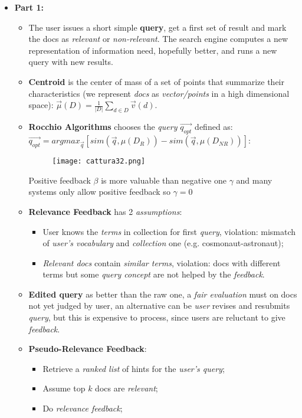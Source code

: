 \documentclass{article}
\begin{document}
\begin{itemize}
\item \textbf{Part 1:}
\begin{itemize}
\item The user issues a short simple \textbf{query}, get a first set of result and mark the docs as \emph{relevant} or \emph{non-relevant}. The search engine computes a new representation of information need, hopefully better, and runs a new query with new results. 
\item \textbf{Centroid} is the center of mass of a set of points that summarize their characteristics (we represent \emph{docs} as \emph{vector/points} in a high dimensional space): $\vec{\mu} (D) = \frac{1}{|D|}\sum_{d \in D}\vec{v}(d)$. 
\item \textbf{Rocchio Algorithms} chooses the \emph{query} $\vec{q_{opt}}$ defined as:\\ $\vec{q_{opt}} = argmax_{\vec{q}}[sim(\vec{q},\mu(D_R)) - sim(\vec{q},\mu(D_{NR}))]$:
\begin{figure}[H]
  \centering
  \texttt{[image: cattura32.png]}
\end{figure}
Positive feedback $\beta$ is more valuable than negative one $\gamma$ and many systems only allow positive feedback so $\gamma = 0$
\item \textbf{Relevance Feedback} has 2 \emph{assumptions}:
\begin{itemize}
\item User knows the \emph{terms} in collection for first \emph{query}, violation: mismatch of \emph{user's vocabulary} and \emph{collection} one (e.g. cosmonaut-astronaut);
\item \emph{Relevant docs }contain \emph{similar terms}, violation: docs with different terms but some \emph{query concept} are not helped by the \emph{feedback}.
\end{itemize}
\item \textbf{Edited query} as better than the raw one, a \emph{fair evaluation} must on docs not yet judged by user, an alternative can be \emph{user} revises and resubmits \emph{query}, but this is expensive to process, since users are reluctant to give \emph{feedback}.
\item \textbf{Pseudo-Relevance Feedback}:
\begin{itemize}
\item Retrieve a \emph{ranked list} of hints for the \emph{user's query};
\item Assume top $k$ docs are \emph{relevant};
\item Do \emph{relevance feedback};

\end{itemize}
\end{itemize}
\end{itemize}
\end{document}

